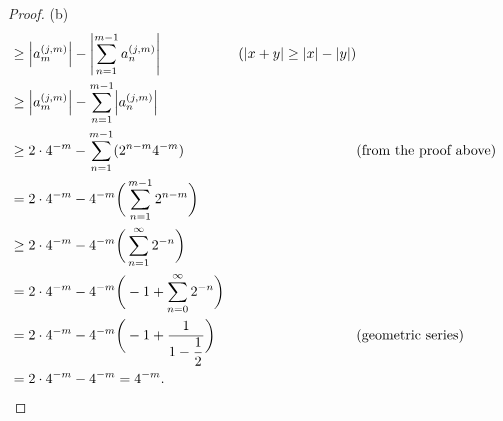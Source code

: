 \begin{proof}{(b)}
\begin{align*}
     & \geq \abs{a_m^{(j, m)}} - \abs{\sum_{n = 1}^{m - 1} a_n^{(j, m)}}                               & (\abs{x + y} \geq \abs{x} - \abs{y})                                 \\
     & \geq \abs{a_m^{(j, m)}} - \sum_{n = 1}^{m - 1} \abs{a_n^{(j, m)}}                                                                                                      \\
     & \geq 2 \cdot 4^{-m} - \sum_{n = 1}^{m - 1} (2^{n - m} 4^{-m})                                   &                                      & \text{(from the proof above)} \\
     & = 2 \cdot 4^{-m} - 4^{-m} \bigg(\sum_{n = 1}^{m - 1} 2^{n - m}\bigg)                                                                                                   \\
     & \geq 2 \cdot 4^{-m} - 4^{-m} \bigg(\sum_{n = 1}^\infty 2^{-n}\bigg)                                                                                                    \\
     & = 2 \cdot 4^{-m} - 4^{-m} \bigg(-1 + \sum_{n = 0}^\infty 2^{-n}\bigg)                                                                                                  \\
     & = 2 \cdot 4^{-m} - 4^{-m} \bigg(-1 + \dfrac{1}{1 - \dfrac{1}{2}}\bigg)                          &                                      & \text{(geometric series)}     \\
     & = 2 \cdot 4^{-m} - 4^{-m} = 4^{-m}.
  \end{align*}
\end{proof}

